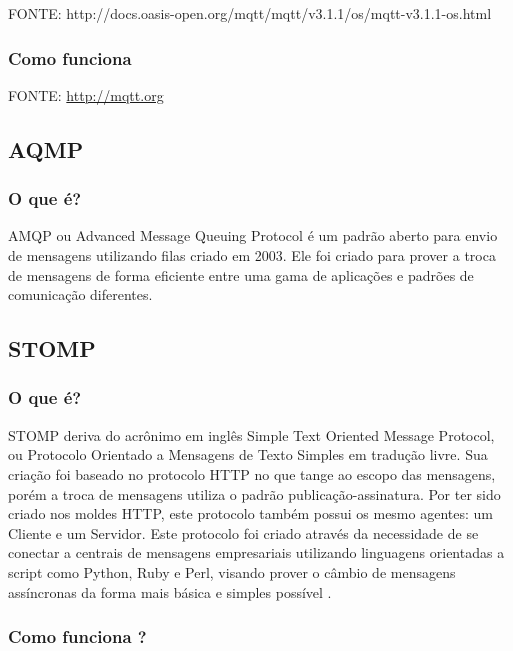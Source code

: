 FONTE: http://docs.oasis-open.org/mqtt/mqtt/v3.1.1/os/mqtt-v3.1.1-os.html

\subsubsection*{Como funciona}


FONTE:
\url{http://mqtt.org}


\subsection{AQMP}

\subsubsection*{O que é?}
AMQP ou Advanced Message Queuing Protocol é um padrão aberto para envio de mensagens utilizando filas criado em 2003. Ele foi criado para prover a troca de mensagens de forma eficiente entre uma gama de aplicações e padrões de comunicação diferentes. 


\subsection{STOMP}

\subsubsection*{O que é?}

STOMP deriva do acrônimo em inglês Simple Text Oriented Message Protocol, ou Protocolo Orientado a Mensagens de Texto Simples em tradução livre. Sua criação foi baseado no protocolo HTTP no que tange ao escopo das mensagens, porém a troca de mensagens utiliza o padrão publicação-assinatura. Por ter sido criado nos moldes HTTP, este protocolo também possui os mesmo agentes: um Cliente e um Servidor. Este protocolo foi criado através da necessidade de se conectar a centrais de mensagens empresariais utilizando linguagens orientadas a script como Python, Ruby e Perl, visando prover o câmbio de mensagens assíncronas da forma mais básica e simples possível \cite{url_stomp2018_stompSpecification}. 


\subsubsection*{Como funciona ?}

